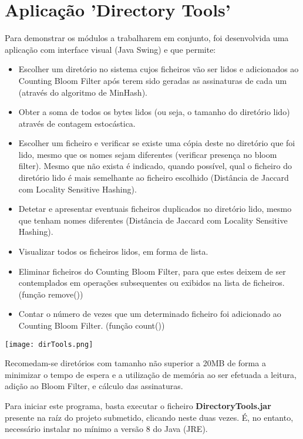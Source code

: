\documentclass{report}
\begin{document}
\section{Aplicação 'Directory Tools'}
Para demonstrar os módulos a trabalharem em conjunto, foi desenvolvida uma aplicação com interface visual (Java Swing) e que permite:
\begin{itemize}
    \item Escolher um diretório no sistema cujos ficheiros vão ser lidos e adicionados ao Counting Bloom Filter após terem sido geradas as assinaturas de cada um (através do algoritmo de MinHash).
    \item Obter a soma de todos os bytes lidos (ou seja, o tamanho do diretório lido) através de contagem estocástica.
    \item Escolher um ficheiro e verificar se existe uma cópia deste no diretório que foi lido, mesmo que os nomes sejam diferentes (verificar presença no bloom filter). Mesmo que não exista é indicado, quando possível, qual o ficheiro do diretório lido é mais semelhante ao ficheiro escolhido (Distância de Jaccard com Locality Sensitive Hashing).
    \item Detetar e apresentar eventuais ficheiros duplicados no diretório lido, mesmo que tenham nomes diferentes (Distância de Jaccard com Locality Sensitive Hashing).
    \item Visualizar todos os ficheiros lidos, em forma de lista.
    \item Eliminar ficheiros do Counting Bloom Filter, para que estes deixem de ser contemplados em operações subsequentes ou exibidos na lista de ficheiros. (função remove())
    \item Contar o número de vezes que um determinado ficheiro foi adicionado ao Counting Bloom Filter. (função count())
\end{itemize}

\begin{center}
\texttt{[image: dirTools.png]}
\end{center}

Recomedam-se diretórios com tamanho não superior a 20MB de forma a minimizar o tempo de espera e a utilização de memória ao ser efetuada a leitura, adição ao Bloom Filter, e cálculo das assinaturas.\newline
\par
Para iniciar este programa, basta executar o ficheiro \textbf{DirectoryTools.jar} presente na raíz do projeto submetido, clicando neste duas vezes. É, no entanto, necessário instalar no mínimo a versão 8 do Java (JRE). \newline
\end{document}
